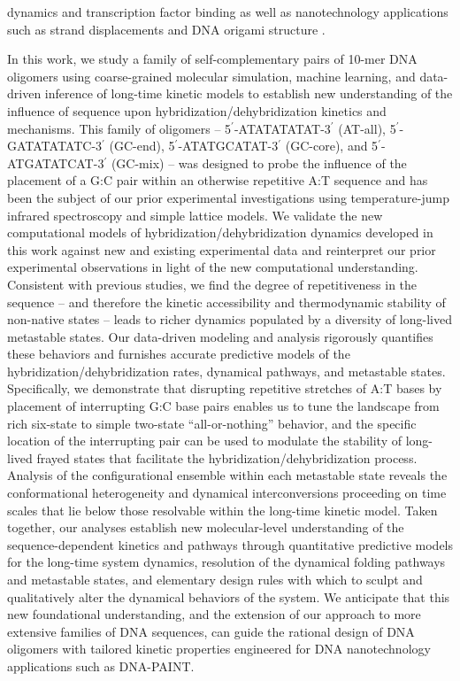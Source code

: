 \documentclass[journal=jpcbfk,manuscript=article]{achemso}
\begin{document}
dynamics\citep{Lequieu2016Tension-dependentUnwrapping, Lequieu2017InSliding} and transcription factor binding \cite{Terakawa2015P53Simulations, Tan2018DynamicData} as well as nanotechnology applications such as strand displacements \citep{Srinivas2013OnDisplacement, Haley2020DesignDisplacement} and DNA origami structure \citep{Snodin2019Coarse-grainedOrigami, Doye2020TheOrigami}.

In this work, we study a family of self-complementary pairs of 10-mer DNA oligomers using coarse-grained molecular simulation, machine learning, and data-driven inference of long-time kinetic models to establish new understanding of the influence of sequence upon hybridization/dehybridization kinetics and mechanisms. This family of oligomers -- 5$^\prime$-ATATATATAT-3$^\prime$ (AT-all), 5$^\prime$-GATATATATC-3$^\prime$ (GC-end), 5$^\prime$-ATATGCATAT-3$^\prime$ (GC-core), and 5$^\prime$-ATGATATCAT-3$^\prime$ (GC-mix) -- was designed to probe the influence of the placement of a G:C pair within an otherwise repetitive A:T sequence and has been the subject of our prior experimental investigations using temperature-jump infrared spectroscopy and simple lattice models. \citep{Sanstead2016} We validate the new computational models of hybridization/dehybridization dynamics developed in this work against new and existing experimental data and reinterpret our prior experimental observations in light of the new computational understanding. Consistent with previous studies, \citep{Phys2014,Romano2013DNADependence,Araque2016LatticeCooperativity} we find the degree of repetitiveness in the sequence -- and therefore the kinetic accessibility and thermodynamic stability of non-native states -- leads to richer dynamics populated by a diversity of long-lived metastable states. Our data-driven modeling and analysis rigorously quantifies these behaviors and furnishes accurate predictive models of the hybridization/dehybridization rates, dynamical pathways, and metastable states. Specifically, we demonstrate that disrupting repetitive stretches of A:T bases by placement of interrupting G:C base pairs enables us to tune the landscape from rich six-state to simple two-state ``all-or-nothing'' behavior, and the specific location of the interrupting pair can be used to modulate the stability of long-lived frayed states that facilitate the hybridization/dehybridization process. Analysis of the configurational ensemble within each metastable state reveals the conformational heterogeneity and dynamical interconversions proceeding on time scales that lie below those resolvable within the long-time kinetic model. Taken together, our analyses establish new molecular-level understanding of the sequence-dependent kinetics and pathways through quantitative predictive models for the long-time system dynamics, resolution of the dynamical folding pathways and metastable states, and elementary design rules with which to sculpt and qualitatively alter the dynamical behaviors of the system. We anticipate that this new foundational understanding, and the extension of our approach to more extensive families of DNA sequences, can guide the rational design of DNA oligomers with tailored kinetic properties engineered for DNA nanotechnology applications such as DNA-PAINT. \citep{Shah2019, Strauss2020UpDNA-PAINT}
\end{document}

